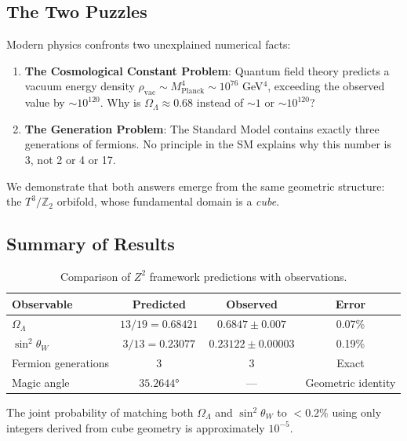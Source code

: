 \documentclass[12pt,a4paper]{article}
\newcommand{\Ztwo}{\mathbb{Z}_2}
\newcommand{\Tthree}{T^3}
\newcommand{\OmegaL}{\Omega_\Lambda}
\newcommand{\sinW}{\sin^2\theta_W}
\begin{document}
\subsection{The Two Puzzles}

Modern physics confronts two unexplained numerical facts:

\begin{enumerate}
    \item \textbf{The Cosmological Constant Problem}: Quantum field theory predicts a vacuum energy density $\rho_{\text{vac}} \sim M_{\text{Planck}}^4 \sim 10^{76}$ GeV$^4$, exceeding the observed value by $\sim 10^{120}$. Why is $\OmegaL \approx 0.68$ instead of $\sim 1$ or $\sim 10^{120}$?

    \item \textbf{The Generation Problem}: The Standard Model contains exactly three generations of fermions. No principle in the SM explains why this number is 3, not 2 or 4 or 17.
\end{enumerate}

We demonstrate that both answers emerge from the same geometric structure: the $\Tthree/\Ztwo$ orbifold, whose fundamental domain is a \emph{cube}.

\subsection{Summary of Results}

\begin{table}[H]
\centering
\begin{tabular}{lccc}
\toprule
\textbf{Observable} & \textbf{Predicted} & \textbf{Observed} & \textbf{Error} \\
\midrule
$\OmegaL$ & $13/19 = 0.68421$ & $0.6847 \pm 0.007$ & 0.07\% \\
$\sinW$ & $3/13 = 0.23077$ & $0.23122 \pm 0.00003$ & 0.19\% \\
Fermion generations & 3 & 3 & Exact \\
Magic angle & $35.2644°$ & --- & Geometric identity \\
\bottomrule
\end{tabular}
\caption{Comparison of $Z^2$ framework predictions with observations.}
\label{tab:results}
\end{table}

The joint probability of matching both $\OmegaL$ and $\sinW$ to $<0.2\%$ using only integers derived from cube geometry is approximately $10^{-5}$.

\end{document}
